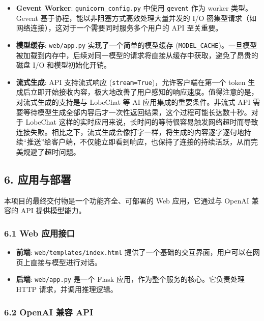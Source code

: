 \documentclass[a4paper]{article}
\providecommand{\tightlist}{%
  \setlength{\itemsep}{0pt}\setlength{\parskip}{0pt}}
\begin{document}
\begin{itemize}
\tightlist
\item
  \textbf{Gevent Worker}: \texttt{gunicorn\_config.py} 中使用
  \texttt{gevent} 作为 worker 类型。Gevent
  基于协程，能以非阻塞方式高效处理大量并发的 I/O
  密集型请求（如网络连接），这对于一个需要同时服务多个用户的 API
  至关重要。
\item
  \textbf{模型缓存}: \texttt{web/app.py} 实现了一个简单的模型缓存
  (\texttt{MODEL\_CACHE})。一旦模型被加载到内存中，后续对同一模型的请求将直接从缓存中获取，避免了昂贵的磁盘
  I/O 和模型初始化开销。
\item
  \textbf{流式生成}: API 支持流式响应
  (\texttt{stream=True})，允许客户端在第一个 token
  生成后立即开始接收内容，极大地改善了用户感知的响应速度。值得注意的是，对流式生成的支持是与
  LobeChat 等 AI 应用集成的重要条件。非流式 API
  需要等待模型生成全部内容后才一次性返回结果，这个过程可能长达数十秒。对于
  LobeChat
  这样的实时应用来说，长时间的等待很容易触发网络超时而导致连接失败。相比之下，流式生成会像打字一样，将生成的内容逐字逐句地持续``推送''给客户端，不仅能立即看到响应，也保持了连接的持续活跃，从而完美规避了超时问题。
\end{itemize}

\subsection{6. 应用与部署}\label{ux5e94ux7528ux4e0eux90e8ux7f72}

本项目的最终交付物是一个功能齐全、可部署的 Web 应用，它通过与 OpenAI
兼容的 API 提供模型能力。

\subsubsection{6.1 Web 应用接口}\label{web-ux5e94ux7528ux63a5ux53e3}

\begin{itemize}
\tightlist
\item
  \textbf{前端}: \texttt{web/templates/index.html}
  提供了一个基础的交互界面，用户可以在网页上直接与模型进行对话。
\item
  \textbf{后端}: \texttt{web/app.py} 是一个 Flask
  应用，作为整个服务的核心。它负责处理 HTTP 请求，并调用推理逻辑。
\end{itemize}

\subsubsection{6.2 OpenAI 兼容 API}\label{openai-ux517cux5bb9-api}
\end{document}
